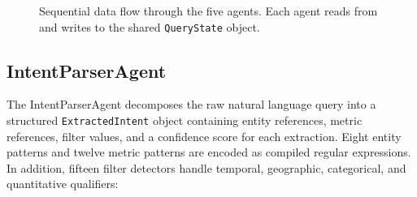 \documentclass[12pt,a4paper]{report}
\begin{document}
\begin{figure}[H]
  \centering
  \caption{Sequential data flow through the five agents. Each agent reads from and writes to the shared \texttt{QueryState} object.}
  \label{fig:pipeline}
\end{figure}

\subsection{IntentParserAgent}
\label{subsec:intent-parser}

The IntentParserAgent decomposes the raw natural language query into a structured \texttt{ExtractedIntent} object containing entity references, metric references, filter values, and a confidence score for each extraction. Eight entity patterns and twelve metric patterns are encoded as compiled regular expressions. In addition, fifteen filter detectors handle temporal, geographic, categorical, and quantitative qualifiers:
\end{document}
